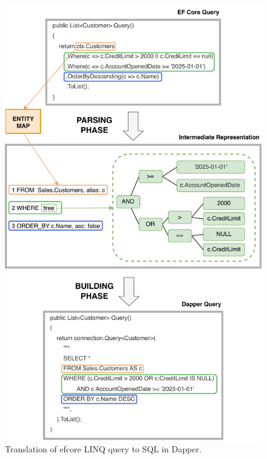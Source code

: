 \begin{figure}[!htp]
  \centering
  \includegraphics[scale=1]{thesis/img/thesis/04_parsing_building_queries.drawio.pdf}
  \caption{Translation of \acrshort{efcore} LINQ query to SQL in Dapper.}
  \label{fig:translation_complete_query}
\end{figure}